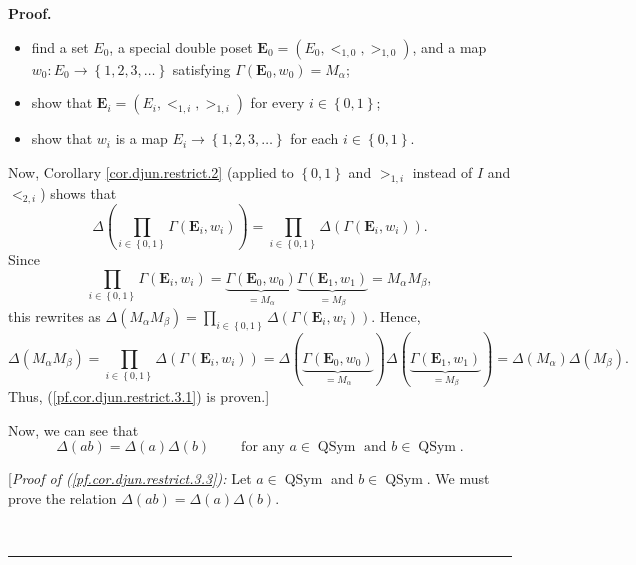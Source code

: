 \documentclass[numbers=enddot,12pt,final,onecolumn,notitlepage,abstracton]{scrartcl}
\theoremstyle{definition}
\newenvironment{proof}[1][Proof]{\noindent\textbf{#1.} }{\ \rule{0.5em}{0.5em}}
\let\prodnonlimits\prod
\renewcommand{\prod}{\prodnonlimits\limits}
\newenvironment{verlong}{}{}
\begin{document}
\begin{verlong}
\begin{footnotesize}
\begin{proof}
\begin{itemize}
\item find a set $E_{0}$, a special double poset $\mathbf{E}_{0}=\left(
E_{0},<_{1,0},>_{1,0}\right)  $, and a map $w_{0}:E_{0}\rightarrow\left\{
1,2,3,\ldots\right\}  $ satisfying $\Gamma\left(  {\mathbf{E}}_{0}%
,w_{0}\right)  =M_{\alpha}$;

\item show that $\mathbf{E}_{i}=\left(  E_{i},<_{1,i},>_{1,i}\right)  $ for
every $i\in\left\{  0,1\right\}  $;

\item show that $w_{i}$ is a map $E_{i}\rightarrow\left\{  1,2,3,\ldots
\right\}  $ for each $i\in\left\{  0,1\right\}  $.
\end{itemize}

Now, Corollary \ref{cor.djun.restrict.2} (applied to $\left\{  0,1\right\}  $
and $>_{1,i}$ instead of $I$ and $<_{2,i}$) shows that
\[
\Delta\left(  \prod_{i\in\left\{  0,1\right\}  }\Gamma\left(  \mathbf{E}%
_{i},w_{i}\right)  \right)  =\prod_{i\in\left\{  0,1\right\}  }\Delta\left(
\Gamma\left(  \mathbf{E}_{i},w_{i}\right)  \right)  .
\]
Since
\[
\prod_{i\in\left\{  0,1\right\}  }\Gamma\left(  \mathbf{E}_{i},w_{i}\right)
=\underbrace{\Gamma\left(  {\mathbf{E}}_{0},w_{0}\right)  }_{=M_{\alpha}%
}\underbrace{\Gamma\left(  {\mathbf{E}}_{1},w_{1}\right)  }_{=M_{\beta}%
}=M_{\alpha}M_{\beta},
\]
this rewrites as $\Delta\left(  M_{\alpha}M_{\beta}\right)  =\prod
_{i\in\left\{  0,1\right\}  }\Delta\left(  \Gamma\left(  \mathbf{E}_{i}%
,w_{i}\right)  \right)  $. Hence,%
\[
\Delta\left(  M_{\alpha}M_{\beta}\right)  =\prod_{i\in\left\{  0,1\right\}
}\Delta\left(  \Gamma\left(  \mathbf{E}_{i},w_{i}\right)  \right)
=\Delta\left(  \underbrace{\Gamma\left(  {\mathbf{E}}_{0},w_{0}\right)
}_{=M_{\alpha}}\right)  \Delta\left(  \underbrace{\Gamma\left(  {\mathbf{E}%
}_{1},w_{1}\right)  }_{=M_{\beta}}\right)  =\Delta\left(  M_{\alpha}\right)
\Delta\left(  M_{\beta}\right)  .
\]
Thus, (\ref{pf.cor.djun.restrict.3.1}) is proven.]

Now, we can see that%
\begin{equation}
\Delta\left(  ab\right)  =\Delta\left(  a\right)  \Delta\left(  b\right)
\ \ \ \ \ \ \ \ \ \ \text{for any }a\in\operatorname*{QSym}\text{ and }%
b\in\operatorname*{QSym}. \label{pf.cor.djun.restrict.3.3}%
\end{equation}


[\textit{Proof of (\ref{pf.cor.djun.restrict.3.3}):} Let $a\in
\operatorname*{QSym}$ and $b\in\operatorname*{QSym}$. We must prove the
relation $\Delta\left(  ab\right)  =\Delta\left(  a\right)  \Delta\left(
b\right)  $.


\end{proof}
\end{footnotesize}
\end{verlong}
\end{document}
